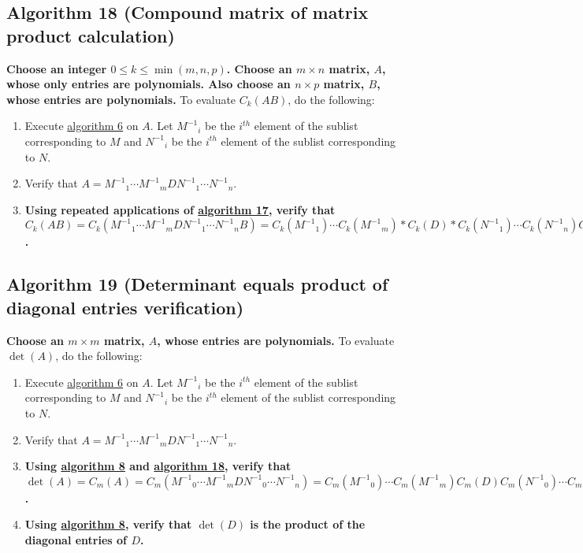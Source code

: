 \documentclass[twocolumn]{article}
\begin{document}
		\subsection{Algorithm 18 (Compound matrix of matrix product calculation)}\label{sec:algorithm 18}
			\textbf{Choose an integer $0\le k\le\min(m,n,p)$. Choose an $m\times n$ matrix, $A$, whose only entries are polynomials. Also choose an $n\times p$ matrix, $B$, whose entries are polynomials.} To evaluate $C_k(AB)$, do the following:
			\begin{enumerate}
				\item Execute \hyperref[sec:algorithm 6]{algorithm 6} on $A$. Let ${M^{-1}}_i$ be the $i^{th}$ element of the sublist corresponding to $M$ and ${N^{-1}}_i$ be the $i^{th}$ element of the sublist corresponding to $N$.
				\item Verify that $A={M^{-1}}_1\cdots {M^{-1}}_mD{N^{-1}}_1\cdots {N^{-1}}_n$.
				\item \textbf{Using repeated applications of \hyperref[sec:algorithm 17]{algorithm 17}, verify that $C_k(AB)=C_k({M^{-1}}_1\cdots {M^{-1}}_mD{N^{-1}}_1\cdots {N^{-1}}_nB)=C_k({M^{-1}}_1)\cdots C_k({M^{-1}}_m)*C_k(D)*C_k({N^{-1}}_1)\cdots C_k({N^{-1}}_n)C_k(B)=C_k({M^{-1}}_1\cdots {M^{-1}}_mD{N^{-1}}_1\cdots {N^{-1}}_n)C_k(B)=C_k(A)C_k(B)$.}
			\end{enumerate}
		\subsection{Algorithm 19 (Determinant equals product of diagonal entries verification)}\label{sec:algorithm 19}
			\textbf{Choose an $m\times m$ matrix, $A$, whose entries are polynomials.} To evaluate $\det(A)$, do the following:
			\begin{enumerate}
				\item Execute \hyperref[sec:algorithm 6]{algorithm 6} on $A$. Let ${M^{-1}}_i$ be the $i^{th}$ element of the sublist corresponding to $M$ and ${N^{-1}}_i$ be the $i^{th}$ element of the sublist corresponding to $N$.
				\item Verify that $A={M^{-1}}_1\cdots {M^{-1}}_mD{N^{-1}}_1\cdots {N^{-1}}_n$.
				\item \textbf{Using \hyperref[sec:algorithm 8]{algorithm 8} and \hyperref[sec:algorithm 18]{algorithm 18}, verify that $\det(A)=C_m(A)=C_m({M^{-1}}_0\cdots {M^{-1}}_mD{N^{-1}}_0\cdots {N^{-1}}_n)=C_m({M^{-1}}_0)\cdots C_m({M^{-1}}_m)C_m(D)C_m({N^{-1}}_0)\cdots C_m({N^{-1}}_n)=1\cdots 1C_m(D)1\cdots 1=C_m(D)=\det(D)$.}
				\item \textbf{Using \hyperref[sec:algorithm 8]{algorithm 8}, verify that $\det(D)$ is the product of the diagonal entries of $D$.}
			\end{enumerate}
\end{document}
